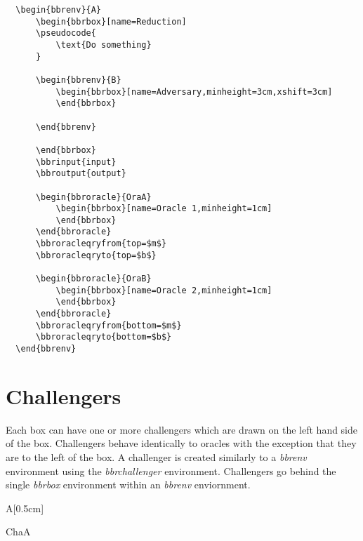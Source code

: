 \documentclass[a4paper]{report}
\begin{document}
  \begin{lstlisting}
  \begin{bbrenv}{A}
	  \begin{bbrbox}[name=Reduction]
	  \pseudocode{
		  \text{Do something} 
	  }
  
	  \begin{bbrenv}{B}
		  \begin{bbrbox}[name=Adversary,minheight=3cm,xshift=3cm]
		  \end{bbrbox}
  
	  \end{bbrenv}
  
	  \end{bbrbox}
	  \bbrinput{input}
	  \bbroutput{output}
  
	  \begin{bbroracle}{OraA}
		  \begin{bbrbox}[name=Oracle 1,minheight=1cm]
		  \end{bbrbox}
	  \end{bbroracle}
	  \bbroracleqryfrom{top=$m$}
	  \bbroracleqryto{top=$b$}
  
	  \begin{bbroracle}{OraB}
		  \begin{bbrbox}[name=Oracle 2,minheight=1cm]
		  \end{bbrbox}
	  \end{bbroracle}
	  \bbroracleqryfrom{bottom=$m$}
	  \bbroracleqryto{bottom=$b$}
  \end{bbrenv}
  \end{lstlisting}
  
  \section{Challengers}
  Each box can have one or more challengers which are drawn on the left hand side of the box. Challengers
  behave identically to oracles with the exception that they are to the left of the box. A challenger
  is created similarly to a \emph{bbrenv} environment using the \emph{bbrchallenger} environment. Challengers
  go behind the single \emph{bbrbox} environment within an \emph{bbrenv} enviornment.
  
  \begin{bbrenv}[1cm]{A}[0.5cm]
	  \begin{bbrbox}[name=Adversary,minheight=2cm]
  
	  \end{bbrbox}
  
	  \begin{bbrchallenger}{ChaA}
		  \begin{bbrbox}[name=Challenger,minheight=2cm]
		  
		  \end{bbrbox}
	  \end{bbrchallenger}
  \end{bbrenv}
  
\end{document}
